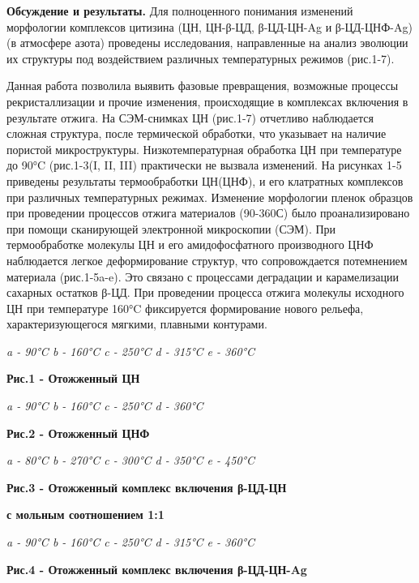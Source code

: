 {\bfseries Обсуждение и результаты.} Для полноценного понимания изменений
морфологии комплексов цитизина (ЦН, ЦН-β-ЦД, β-ЦД-ЦН-Ag и β-ЦД-ЦНФ-Ag)
(в атмосфере азота) проведены исследования, направленные на анализ
эволюции их структуры под воздействием различных температурных режимов
(рис.1-7).

Данная работа позволила выявить фазовые превращения, возможные процессы
рекристаллизации и прочие изменения, происходящие в комплексах включения
в результате отжига. На СЭМ-снимках ЦН (рис.1-7) отчетливо наблюдается
сложная структура, после термической обработки, что указывает на наличие
пористой микроструктуры. Низкотемпературная обработка ЦН при температуре
до 90°C (рис.1-3(I, II, III) практически не вызвала изменений. На
рисунках 1-5 приведены результаты термообработки ЦН(ЦНФ), и его
клатратных комплексов при различных температурных режимах.
Изменение морфологии пленок образцов при проведении процессов отжига
материалов (90-360С) было проанализировано при помощи
сканирующей электронной микроскопии (СЭМ). При термообработке молекулы
ЦН и его амидофосфатного производного ЦНФ наблюдается легкое
деформирование структур, что сопровождается потемнением материала
(рис.1-5a-e). Это связано с процессами деградации и карамелизации
сахарных остатков β-ЦД. При проведении процесса отжига молекулы
исходного ЦН при температуре 160°C фиксируется формирование нового
рельефа, характеризующегося мягкими, плавными контурами.


\emph{a - 90°C b - 160°C c - 250°C d - 315°C e - 360°C}

{\bfseries Рис.1 - Отожженный ЦН}


\emph{a - 90°C b - 160°C c - 250°C d - 360°C}

{\bfseries Рис.2 - Отожженный ЦНФ}


\emph{a - 80°C b - 270°C c - 300°C d - 350°C e - 450°C}

{\bfseries Рис.3 - Отожженный комплекс включения β-ЦД-ЦН}

{\bfseries с мольным соотношением 1:1}


\emph{a - 90°C b - 160°C c - 250°C d - 315°C e - 360°C}

{\bfseries Рис.4 - Отожженный комплекс включения β-ЦД-ЦН-Ag}


